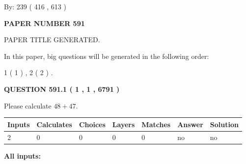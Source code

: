 \documentclass[12pt]{article}
\begin{document}
   
\hspace{1.0in} By: 
 239 ( 416 ,  613 )
   
   
   
   
\newpage 
\setcounter{page}{ 
   591001 } 
   
   
   
   
 {\textbf{ \Large{ PAPER NUMBER  591  }}}
   
   
\vspace{0.2in}
   
   
   
   
   
   
   
   
 \vspace{0.2in}
 
 
 
 
   
   
 PAPER TITLE GENERATED.
   
   
   
\vspace{0.2in}
   
In this paper, big questions will be generated in the following order: 
   
   
   1 ( 1 )
 ,
   2 ( 2 )
 .
  
\vspace{0.2in}
  
{\textbf{\Large{QUESTION
591.1 
 ( 1 , 1 , 6791 )
}}}
  
  
 
Please calculate $ %
48 +  %
47 $.
 
 
   
   
   
   
\noindent\begin{tabular}{|l|l|l|l|l|l|l|}
 \hline
Inputs & Calculates & Choices & Layers & Matches & Answer & Solution \\ \hline
 2  & 
 0  & 
 0
  & 
 0  & 
 0  & 
  no & 
  no 
  \\ \hline
 \end{tabular}
   
   
   
   
\noindent{}
   
   
   
   
\noindent\vspace{0.1in}\hspace{-0.08in} {\textbf{\Large{All inputs: }}}
   
\end{document}
